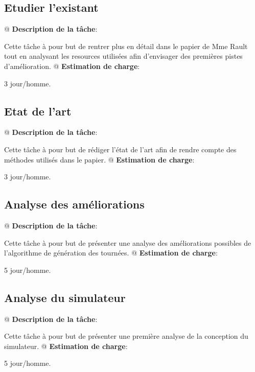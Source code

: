 \documentclass[final]{polytech/polytech}
\begin{document}
		\subsection{Etudier l’existant}
			\begin{easylist}
				@ \textbf{Description de la tâche}:
				
				Cette tâche à pour but de rentrer plus en détail dans le papier de Mme Rault tout en analysant les resources utilisées afin d'envisager des premières pistes d'amélioration.
				@ \textbf{Estimation de charge}:
				
				3 jour/homme.
			\end{easylist}
			
		\subsection{Etat de l'art}
			\begin{easylist}
				@ \textbf{Description de la tâche}:
				
				Cette tâche à pour but de rédiger l'état de l'art afin de rendre compte des méthodes utilisés dans le papier.
				@ \textbf{Estimation de charge}:
				
				3 jour/homme.
			\end{easylist}
			
		\subsection{Analyse des améliorations}
			\begin{easylist}
				@ \textbf{Description de la tâche}:
				
				Cette tâche à pour but de présenter une analyse des améliorations possibles de l'algorithme de génération des tournées.
				@ \textbf{Estimation de charge}:
				
				5 jour/homme.
			\end{easylist}
			
		\subsection{Analyse du simulateur}
			\begin{easylist}
				@ \textbf{Description de la tâche}:
				
				Cette tâche à pour but de présenter une première analyse de la conception du simulateur.
				@ \textbf{Estimation de charge}:
				
				5 jour/homme.
			\end{easylist}
			
\end{document}
